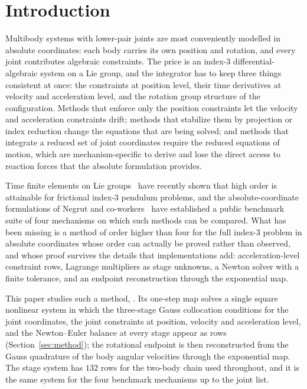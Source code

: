 
\section{Introduction}

Multibody systems with lower-pair joints are most conveniently modelled in absolute coordinates:
each body carries its own position and rotation, and every joint contributes algebraic constraints.
The price is an index-3 differential-algebraic system on a Lie group, and the integrator has to keep
three things consistent at once: the constraints at position level, their time derivatives at
velocity and acceleration level, and the rotation group structure of the configuration. Methods
that enforce only the position constraints let the velocity and acceleration constraints drift;
methods that stabilize them by projection or index reduction change the equations that are being
solved; and methods that integrate a reduced set of joint coordinates require the reduced equations
of motion, which are mechanism-specific to derive and lose the direct access to reaction forces
that the absolute formulation provides.

Time finite elements on Lie groups~\cite{chaturvedi2026tfe} have recently shown that high order is
attainable for frictional index-3 pendulum problems, and the absolute-coordinate formulations of
Negrut and co-workers~\cite{taves2020exponential,kissel2021dwelling,kissel2022absolute,fang2023halfimplicit}
have established a public benchmark suite of four mechanisms on which such methods can be compared.
What has been missing is a method of order higher than four for the full index-3 problem in
absolute coordinates whose order can actually be proved rather than observed, and whose proof
survives the details that implementations add: acceleration-level constraint rows, Lagrange
multipliers as stage unknowns, a Newton solver with a finite tolerance, and an endpoint
reconstruction through the exponential map.

This paper studies such a method, \method{}. Its one-step map solves a single square nonlinear
system in which the three-stage Gauss collocation conditions for the joint coordinates, the joint
constraints at position, velocity and acceleration level, and the Newton--Euler balance at every
stage appear as rows (Section~\ref{sec:method}); the rotational endpoint is then reconstructed from
the Gauss quadrature of the body angular velocities through the exponential map. The stage system
has $132$ rows for the two-body chain used throughout, and it is the same system for the four
benchmark mechanisms up to the joint list.

